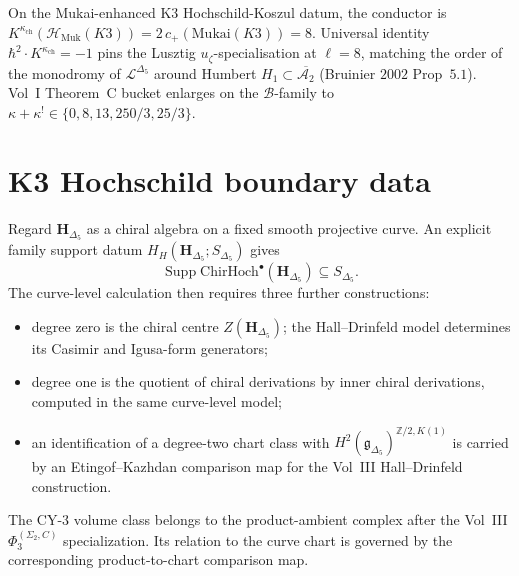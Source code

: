 \begin{remark}[Mukai doubling $K^{\kappa_{\mathrm{ch}}} = 8$]
\label{rem:chk-Kkappa-8}
On the Mukai-enhanced K3 Hochschild-Koszul datum, the conductor is
$K^{\kappa_{\mathrm{ch}}}(\mathcal{H}_{\mathrm{Muk}}(K3)) = 2\,c_+(\mathrm{Mukai}(K3)) = 8$.
Universal identity $\hbar^2 \cdot K^{\kappa_{\mathrm{ch}}} = -1$ pins the Lusztig
$u_\zeta$-specialisation at $\ell = 8$, matching the order of the monodromy of
$\mathcal{L}^{\Delta_5}$ around Humbert $H_1 \subset \overline{\mathcal{A}_2}$
(Bruinier $2002$ Prop~$5.1$). Vol~I Theorem~C bucket enlarges on the
$\mathcal{B}$-family to $\kappa + \kappa^! \in \{0, 8, 13, 250/3, 25/3\}$.
\end{remark}

\section{K3 Hochschild boundary data}
\label{sec:chk-deep}

\begin{remark}
\label{rem:chk-deep-1}
Regard \(\mathbf H_{\Delta_5}\) as a chiral algebra on a fixed smooth
projective curve.  An explicit family support datum
\(H_H(\mathbf H_{\Delta_5};S_{\Delta_5})\) gives
\[
 \operatorname{Supp}
 \mathrm{ChirHoch}^\bullet(\mathbf H_{\Delta_5})
 \subseteq S_{\Delta_5}.
\]
The curve-level calculation then requires three further constructions:
\begin{itemize}
\item degree zero is the chiral centre
\(Z(\mathbf H_{\Delta_5})\); the Hall--Drinfeld model determines its
Casimir and Igusa-form generators;
\item degree one is the quotient of chiral derivations by inner chiral
derivations, computed in the same curve-level model;
\item an identification of a degree-two chart class with
\(H^2(\mathfrak g_{\Delta_5})^{\mathbb Z/2,K(1)}\) is carried by an
Etingof--Kazhdan comparison map for the Vol~III Hall--Drinfeld
construction.
\end{itemize}
The CY-\(3\) volume class belongs to the product-ambient complex after
the Vol~III \(\Phi_3^{(\Sigma_2,C)}\) specialization.  Its relation to
the curve chart is governed by the corresponding product-to-chart
comparison map.
\end{remark}

